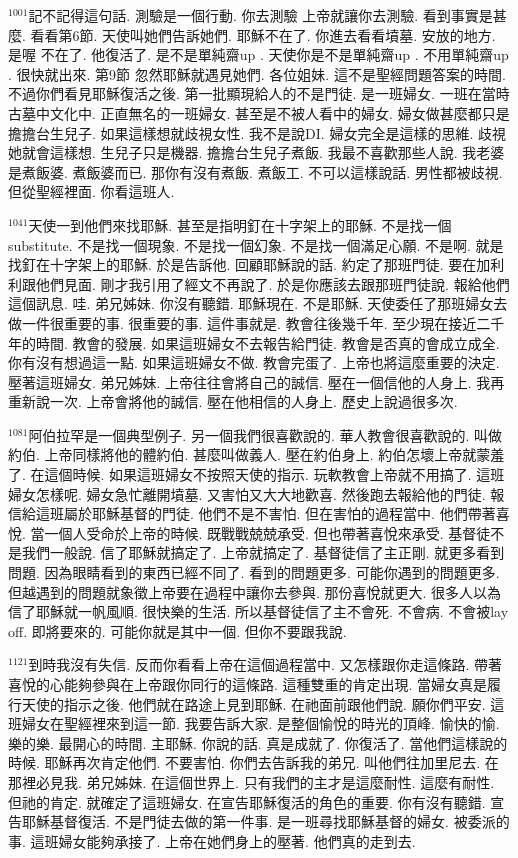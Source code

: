 \documentclass{book}
\begin{document}
$^{1001}$記不記得這句話.
測驗是一個行動.
你去測驗 上帝就讓你去測驗.
看到事實是甚麼.
看看第6節.
天使叫她們告訴她們.
耶穌不在了.
你進去看看墳墓.
安放的地方.
是喔 不在了.
他復活了.
是不是單純齋up .
天使你是不是單純齋up .
不用單純齋up .
很快就出來.
第9節 忽然耶穌就遇見她們.
各位姐妹.
這不是聖經問題答案的時間.
不過你們看見耶穌復活之後.
第一批顯現給人的不是門徒.
是一班婦女.
一班在當時古墓中文化中.
正直無名的一班婦女.
甚至是不被人看中的婦女.
婦女做甚麼都只是擔擔台生兒子.
如果這樣想就歧視女性.
我不是說DI.
婦女完全是這樣的思維.
歧視她就會這樣想.
生兒子只是機器.
擔擔台生兒子煮飯.
我最不喜歡那些人說.
我老婆是煮飯婆.
煮飯婆而已.
那你有沒有煮飯.
煮飯工.
不可以這樣說話.
男性都被歧視.
但從聖經裡面.
你看這班人.

$^{1041}$天使一到他們來找耶穌.
甚至是指明釘在十字架上的耶穌.
不是找一個substitute.
不是找一個現象.
不是找一個幻象.
不是找一個滿足心願.
不是啊.
就是找釘在十字架上的耶穌.
於是告訴他.
回顧耶穌說的話.
約定了那班門徒.
要在加利利跟他們見面.
剛才我引用了經文不再說了.
於是你應該去跟那班門徒說.
報給他們這個訊息.
哇.
弟兄姊妹.
你沒有聽錯.
耶穌現在.
不是耶穌.
天使委任了那班婦女去做一件很重要的事.
很重要的事.
這件事就是.
教會往後幾千年.
至少現在接近二千年的時間.
教會的發展.
如果這班婦女不去報告給門徒.
教會是否真的會成立成全.
你有沒有想過這一點.
如果這班婦女不做.
教會完蛋了.
上帝也將這麼重要的決定.
壓著這班婦女.
弟兄姊妹.
上帝往往會將自己的誠信.
壓在一個信他的人身上.
我再重新說一次.
上帝會將他的誠信.
壓在他相信的人身上.
歷史上說過很多次.

$^{1081}$阿伯拉罕是一個典型例子.
另一個我們很喜歡說的.
華人教會很喜歡說的.
叫做約伯.
上帝同樣將他的體約伯.
甚麼叫做義人.
壓在約伯身上.
約伯怎壞上帝就蒙羞了.
在這個時候.
如果這班婦女不按照天使的指示.
玩軟教會上帝就不用搞了.
這班婦女怎樣呢.
婦女急忙離開墳墓.
又害怕又大大地歡喜.
然後跑去報給他的門徒.
報信給這班屬於耶穌基督的門徒.
他們不是不害怕.
但在害怕的過程當中.
他們帶著喜悅.
當一個人受命於上帝的時候.
既戰戰兢兢承受.
但也帶著喜悅來承受.
基督徒不是我們一般說.
信了耶穌就搞定了.
上帝就搞定了.
基督徒信了主正剛.
就更多看到問題.
因為眼睛看到的東西已經不同了.
看到的問題更多.
可能你遇到的問題更多.
但越遇到的問題就象徵上帝要在過程中讓你去參與.
那份喜悅就更大.
很多人以為信了耶穌就一帆風順.
很快樂的生活.
所以基督徒信了主不會死.
不會病.
不會被lay off.
即將要來的.
可能你就是其中一個.
但你不要跟我說.

$^{1121}$到時我沒有失信.
反而你看看上帝在這個過程當中.
又怎樣跟你走這條路.
帶著喜悅的心能夠參與在上帝跟你同行的這條路.
這種雙重的肯定出現.
當婦女真是履行天使的指示之後.
他們就在路途上見到耶穌.
在祂面前跟他們說.
願你們平安.
這班婦女在聖經裡來到這一節.
我要告訴大家.
是整個愉悅的時光的頂峰.
愉快的愉.
樂的樂.
最開心的時間.
主耶穌.
你說的話.
真是成就了.
你復活了.
當他們這樣說的時候.
耶穌再次肯定他們.
不要害怕.
你們去告訴我的弟兄.
叫他們往加里尼去.
在那裡必見我.
弟兄姊妹.
在這個世界上.
只有我們的主才是這麼耐性.
這麼有耐性.
但祂的肯定.
就確定了這班婦女.
在宣告耶穌復活的角色的重要.
你有沒有聽錯.
宣告耶穌基督復活.
不是門徒去做的第一件事.
是一班尋找耶穌基督的婦女.
被委派的事.
這班婦女能夠承接了.
上帝在她們身上的壓著.
他們真的走到去.
\end{document}
